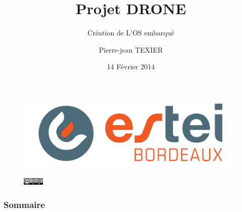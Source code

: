 \documentclass[11pt]{beamer}
\title[segment SOL]{Projet DRONE}
\subtitle{Création de L'OS embarqué}
\institute{ Ecole Supérieure des Technologies Electronique Informatique Infographie  }
\author{Pierre-jean \textsc{TEXIER}}
\date{14 Février 2014}
\begin{document}
	\begin{frame}
	  \maketitle

		\begin{figure}
			\begin{center}
				\includegraphics{commons/estei.png}
			\end{center}
		\end{figure}
		\begin{figure}
			\begin{center}
				\includegraphics[width=1cm]{commons/cc.png}
			\end{center}
		\end{figure}
		
	\end{frame}
		
	\begin{frame}
		\frametitle{Sommaire}
		\begin{columns}[t]
		\begin{column}{5cm}
		\tableofcontents[sections={1-4}]
		\end{column}
		\begin{column}{5cm}
		\tableofcontents[sections={5-8}]
		\end{column}
		\end{columns}
	 \end{frame}
	
\end{document}
